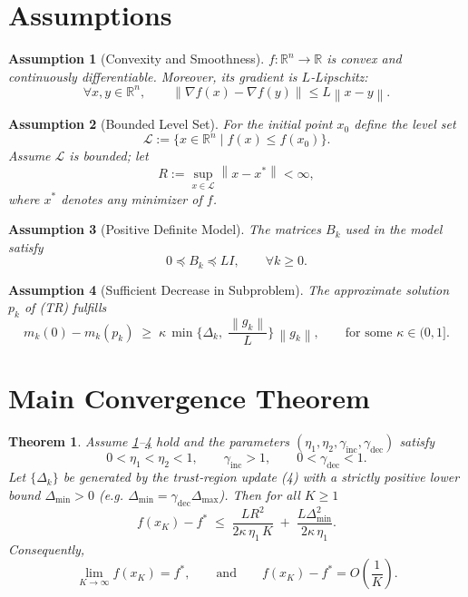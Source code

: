 \documentclass[11pt]{article}
\newtheorem{theorem}{Theorem}
\newtheorem{assumption}{Assumption}
\newcommand{\norm}[1]{\left\lVert #1\right\rVert}
\newcommand{\R}{\mathbb{R}}
\begin{document}
\section*{Assumptions}
\begin{assumption}[Convexity and Smoothness]\label{as:convex}
$f:\R^{n}\rightarrow\R$ is convex and continuously differentiable.
Moreover, its gradient is $L$‑Lipschitz:
\[
\forall x,y\in\R^{n},\qquad 
\norm{\nabla f(x)-\nabla f(y)}\le L\norm{x-y}.
\tag{A1}
\]
\end{assumption}
\begin{assumption}[Bounded Level Set]\label{as:bounded}
For the initial point $x_{0}$ define the level set
\[
\mathcal{L}:=\{x\in\R^{n}\mid f(x)\le f(x_{0})\}.
\]
Assume $\mathcal{L}$ is bounded; let 
\[
R:=\sup_{x\in\mathcal{L}}\norm{x-x^{*}}<\infty,
\]
where $x^{*}$ denotes any minimizer of $f$.
\end{assumption}
\begin{assumption}[Positive Definite Model]\label{as:model}
The matrices $B_{k}$ used in the model satisfy
\[
0\preceq B_{k}\preceq L I,\qquad \forall k\ge0 .
\tag{A3}
\]
\end{assumption}
\begin{assumption}[Sufficient Decrease in Subproblem]\label{as:subopt}
The approximate solution $p_{k}$ of (TR) fulfills
\[
m_{k}(0)-m_{k}(p_{k})\;\ge\;\kappa\,
\min\!\Big\{\Delta_{k},\;\frac{\norm{g_{k}}}{L}\Big\}\,\norm{g_{k}},
\qquad\text{for some }\kappa\in(0,1].
\tag{A4}
\]
\end{assumption}

\section*{Main Convergence Theorem}
\begin{theorem}\label{thm:rate}
Assume \ref{as:convex}–\ref{as:subopt} hold and the parameters
$(\eta_{1},\eta_{2},\gamma_{\text{inc}},\gamma_{\text{dec}})$ satisfy
\[
0<\eta_{1}<\eta_{2}<1,\qquad
\gamma_{\text{inc}}>1,\qquad 0<\gamma_{\text{dec}}<1 .
\]
Let $\{\Delta_{k}\}$ be generated by the trust‑region update (4) with a
strictly positive lower bound $\Delta_{\min}>0$ (e.g. $\Delta_{\min}=
\gamma_{\text{dec}}\Delta_{\max}$). Then for all $K\ge1$
\[
f(x_{K})-f^{*}\;\le\;
\frac{L R^{2}}{2\kappa\,\eta_{1}\,K}\;+\;
\frac{L\Delta_{\min}^{2}}{2\kappa\,\eta_{1}} .
\tag{7}
\]
Consequently,
\[
\lim_{K\to\infty}f(x_{K})=f^{*},\qquad 
\text{and}\qquad 
f(x_{K})-f^{*}=O\!\left(\frac{1}{K}\right).
\]
\end{theorem}
\end{document}
